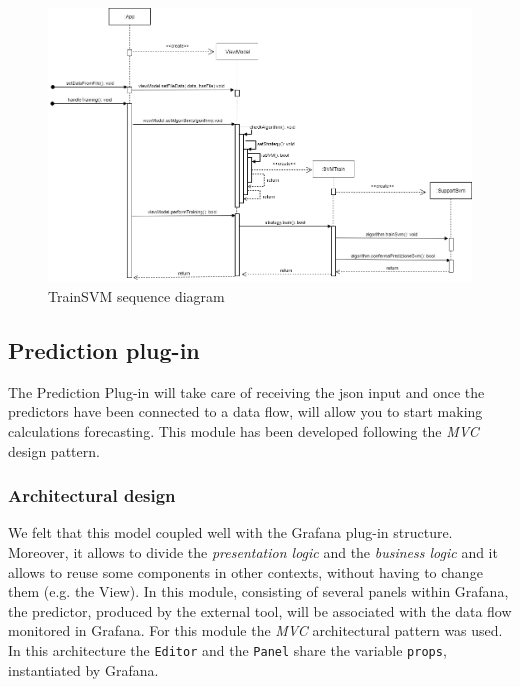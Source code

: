 \begin{landscape}
\begin{center}
\begin{figure}[H]
\centering
\includegraphics[scale=0.60]{../../../Diagrams/Sequence_diagrams/trainSVM.png}
\caption{TrainSVM sequence diagram}
\end{figure}
\end{center}
\end{landscape}

\subsection{Prediction plug-in}
The Prediction Plug-in will take care of receiving the json input and once the predictors have been connected to a data flow, will allow you to start making calculations forecasting. This module has been developed following the \textit{MVC} design pattern.

\subsubsection{Architectural design}
We felt that this model coupled well with the Grafana plug-in structure.
Moreover, it allows to divide the \textit{presentation logic} and the \textit{business logic} and it allows to reuse some components in other contexts, without having to change them (e.g. the View).
In this module, consisting of several panels within Grafana, the predictor, produced by the external tool, will be associated with the data flow monitored in Grafana. For this module the \textit{MVC} architectural pattern was used. In this architecture the \texttt{Editor} and the \texttt{Panel} share the variable \texttt{props}, instantiated by Grafana.

